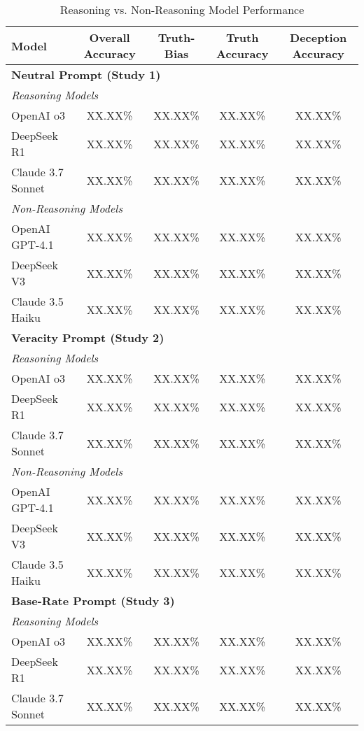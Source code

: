 \documentclass{article}
\begin{document}
\begin{table}[ht]
\centering
\caption{Reasoning vs. Non-Reasoning Model Performance}
\begin{tabular}{lcccc}
\toprule
\textbf{Model} & \textbf{Overall Accuracy} & \textbf{Truth-Bias} & \textbf{Truth Accuracy} & \textbf{Deception Accuracy} \\
\midrule
\multicolumn{5}{l}{\textbf{Neutral Prompt (Study 1)}} \\
\midrule
\multicolumn{5}{l}{\textit{Reasoning Models}} \\
OpenAI o3 & XX.XX\% & XX.XX\% & XX.XX\% & XX.XX\% \\
DeepSeek R1 & XX.XX\% & XX.XX\% & XX.XX\% & XX.XX\% \\
Claude 3.7 Sonnet & XX.XX\% & XX.XX\% & XX.XX\% & XX.XX\% \\
\midrule
\multicolumn{5}{l}{\textit{Non-Reasoning Models}} \\
OpenAI GPT-4.1 & XX.XX\% & XX.XX\% & XX.XX\% & XX.XX\% \\
DeepSeek V3 & XX.XX\% & XX.XX\% & XX.XX\% & XX.XX\% \\
Claude 3.5 Haiku & XX.XX\% & XX.XX\% & XX.XX\% & XX.XX\% \\
\midrule
\multicolumn{5}{l}{\textbf{Veracity Prompt (Study 2)}} \\
\midrule
\multicolumn{5}{l}{\textit{Reasoning Models}} \\
OpenAI o3 & XX.XX\% & XX.XX\% & XX.XX\% & XX.XX\% \\
DeepSeek R1 & XX.XX\% & XX.XX\% & XX.XX\% & XX.XX\% \\
Claude 3.7 Sonnet & XX.XX\% & XX.XX\% & XX.XX\% & XX.XX\% \\
\midrule
\multicolumn{5}{l}{\textit{Non-Reasoning Models}} \\
OpenAI GPT-4.1 & XX.XX\% & XX.XX\% & XX.XX\% & XX.XX\% \\
DeepSeek V3 & XX.XX\% & XX.XX\% & XX.XX\% & XX.XX\% \\
Claude 3.5 Haiku & XX.XX\% & XX.XX\% & XX.XX\% & XX.XX\% \\
\midrule
\multicolumn{5}{l}{\textbf{Base-Rate Prompt (Study 3)}} \\
\midrule
\multicolumn{5}{l}{\textit{Reasoning Models}} \\
OpenAI o3 & XX.XX\% & XX.XX\% & XX.XX\% & XX.XX\% \\
DeepSeek R1 & XX.XX\% & XX.XX\% & XX.XX\% & XX.XX\% \\
Claude 3.7 Sonnet & XX.XX\% & XX.XX\% & XX.XX\% & XX.XX\% \\

\end{tabular}
\end{table}
\end{document}
